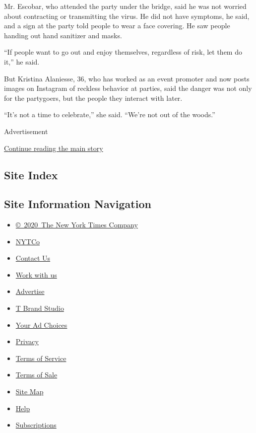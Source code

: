 Mr. Escobar, who attended the party under the bridge, said he was not
worried about contracting or transmitting the virus. He did not have
symptoms, he said, and a sign at the party told people to wear a face
covering. He saw people handing out hand sanitizer and masks.

``If people want to go out and enjoy themselves, regardless of risk, let
them do it,'' he said.

But Kristina Alaniesse, 36, who has worked as an event promoter and now
posts images on Instagram of reckless behavior at parties, said the
danger was not only for the partygoers, but the people they interact
with later.

``It's not a time to celebrate,'' she said. ``We're not out of the
woods.''

Advertisement

\protect\hyperlink{after-bottom}{Continue reading the main story}

\hypertarget{site-index}{%
\subsection{Site Index}\label{site-index}}

\hypertarget{site-information-navigation}{%
\subsection{Site Information
Navigation}\label{site-information-navigation}}

\begin{itemize}
\tightlist
\item
  \href{https://help.nytimes.com/hc/en-us/articles/115014792127-Copyright-notice}{©~2020~The
  New York Times Company}
\end{itemize}

\begin{itemize}
\tightlist
\item
  \href{https://www.nytco.com/}{NYTCo}
\item
  \href{https://help.nytimes.com/hc/en-us/articles/115015385887-Contact-Us}{Contact
  Us}
\item
  \href{https://www.nytco.com/careers/}{Work with us}
\item
  \href{https://nytmediakit.com/}{Advertise}
\item
  \href{http://www.tbrandstudio.com/}{T Brand Studio}
\item
  \href{https://www.nytimes.com/privacy/cookie-policy\#how-do-i-manage-trackers}{Your
  Ad Choices}
\item
  \href{https://www.nytimes.com/privacy}{Privacy}
\item
  \href{https://help.nytimes.com/hc/en-us/articles/115014893428-Terms-of-service}{Terms
  of Service}
\item
  \href{https://help.nytimes.com/hc/en-us/articles/115014893968-Terms-of-sale}{Terms
  of Sale}
\item
  \href{https://spiderbites.nytimes.com}{Site Map}
\item
  \href{https://help.nytimes.com/hc/en-us}{Help}
\item
  \href{https://www.nytimes.com/subscription?campaignId=37WXW}{Subscriptions}
\end{itemize}
